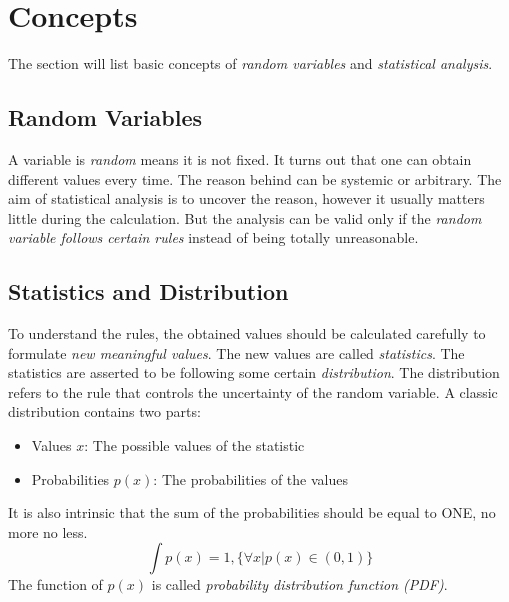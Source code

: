 \documentclass[./main.tex]{subfiles}
\begin{document}
\section{Concepts}
The section will list basic concepts of \emph{random variables} and \emph{statistical analysis}.

\subsection{Random Variables}
A variable is \emph{random} means it is not fixed.
It turns out that one can obtain different values every time.
The reason behind can be systemic or arbitrary.
The aim of statistical analysis is to uncover the reason, however it usually matters little during the calculation.
But the analysis can be valid only if the \emph{random variable follows certain rules} instead of being totally unreasonable.

\subsection{Statistics and Distribution}
To understand the rules, the obtained values should be calculated carefully to formulate \emph{new meaningful values}.
The new values are called \emph{statistics}.
The statistics are asserted to be following some certain \emph{distribution}.
The distribution refers to the rule that controls the uncertainty of the random variable.
A classic distribution contains two parts:
\begin{itemize}
    \item Values $x$: The possible values of the statistic
    \item Probabilities $p(x)$: The probabilities of the values
\end{itemize}
It is also intrinsic that the sum of the probabilities should be equal to ONE, no more no less.
\begin{equation*}
    \int p(x) = 1, \{ \forall x | p(x) \in (0, 1) \}
\end{equation*}
The function of $p(x)$ is called \emph{probability distribution function (PDF)}.
\end{document}

